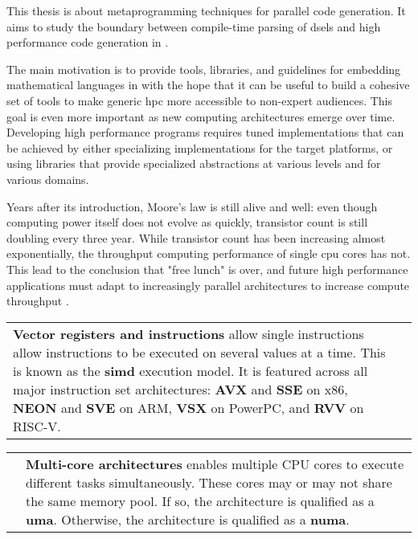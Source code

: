 \documentclass[main]{subfiles}
\begin{document}
This thesis is about metaprogramming techniques for parallel code generation.
It aims to study the boundary between compile-time parsing of
\glspl{dsel} and high performance code generation in \cpp.

The main motivation is to provide tools, libraries, and guidelines for embedding
mathematical languages in \cpp with the hope that it can be useful to build a
cohesive set of tools to make generic \gls{hpc} more accessible
to non-expert audiences. This goal is even more important as new computing
architectures emerge over time. Developing high performance programs requires
tuned implementations that can be achieved by either specializing
implementations for the target platforms, or using libraries that provide
specialized abstractions at various levels and for various domains.

Years after its introduction, Moore's law is still alive and well:
even though computing power itself does not evolve as quickly,
transistor count is still doubling every three year.
While transistor count has been increasing almost exponentially,
the throughput computing performance of single \gls{cpu} cores has not.
This lead to the conclusion that "free lunch" is over, and future
high performance applications must adapt to increasingly parallel architectures
to increase compute throughput
\cite{concurrency-revolution, doi:10.1142/S0129626404001829}.

\begin{center}
\begin{tabular}{p{} p{}}
\textbf{Vector registers and instructions} allow single instructions allow
instructions to be executed on several values at a time. This is known as
the \textbf{\gls{simd}} execution model. It is featured across all major
instruction set architectures:
\textbf{AVX} and \textbf{SSE} on x86, \textbf{NEON} and \textbf{SVE} on ARM,
\textbf{VSX} on PowerPC, and \textbf{RVV} on RISC-V.
&
\raisebox{-.925\height}{}
\end{tabular}
\end{center}

\begin{center}
\begin{tabular}{p{} p{}}
\raisebox{-.925\height}{}
&
\textbf{Multi-core architectures} enables multiple CPU cores to execute
different tasks simultaneously. These cores may or may not share the same
memory pool. If so, the architecture is qualified as a \textbf{\gls{uma}}.
Otherwise, the architecture is qualified as a \textbf{\gls{numa}}.
\end{tabular}
\end{center}
\end{document}
